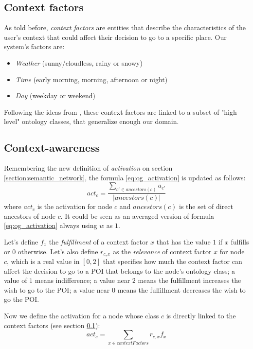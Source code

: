 \subsection{Context factors} \label{section:context_factors}
As told before, \textit{context factors} are entities that describe the characteristics of the user's context that could affect their decision to go to a specific place. Our system's factors are: 
\begin{itemize}
    \item \textit{Weather} (sunny/cloudless, rainy or snowy)
    \item \textit{Time} (early morning, morning, afternoon or night)
    \item \textit{Day} (weekday or weekend)
\end{itemize}
Following the ideas from \cite{bahramian_abbaspour_claramunt_2017}, these context factors are linked to a subset of "high level" ontology classes, that generalize enough our domain. 

\subsection{Context-awareness} \label{section:context-awareness}
Remembering the new definition of \textit{activation} on section \ref{section:semantic_network}, the formula \ref{eq:og_activation} is updated as follows:
\begin{equation} \label{eq:activation}
    act_c = \frac{\displaystyle \sum_{c' \in ancestors(c)} a_{c'}}{|ancestors(c)|}
\end{equation}
where $act_c$ is the activation for node $c$ and $ancestors(c)$ is the set of direct ancestors of node $c$. It could be seen as an averaged version of formula \ref{eq:og_activation} always using $w$ as $1$.

Let's define $f_x$ the \textit{fulfillment} of a context factor $x$ that has the value $1$ if $x$ fulfills or $0$ otherwise. Let's also define $r_{c,x}$ as the \textit{relevance} of context factor $x$ for node $c$, which is a real value in $[0, 2]$ that specifies how much the context factor can affect the decision to go to a POI that belongs to the node's ontology class; a value of $1$ means indifference; a value near $2$ means the fulfillment increases the wish to go to the POI; a value near $0$ means the fulfillment decreases the wish to go the POI. 

Now we define the activation for a node whose class $c$ is directly linked to the context factors (see section \ref{section:context_factors}):
\begin{equation} \label{eq:high_activation}
    act_c = \sum_{x \in contextFactors} r_{c,x} f_x
\end{equation}

